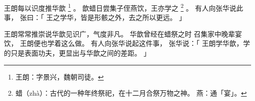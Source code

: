 
\switchcolumn*[\section{}]

王朗每以识度推华歆%
\footnote{%
    王朗：字景兴，魏朝司徒。
}%
。
歆蜡日尝集子侄燕饮，王亦学之%
\footnote{%
    蜡（zhà）：古代的一种年终祭祀，在十二月合祭万物之神。
    燕：通「宴」。
}%
。
有人向张华说此事，
张曰：「
    王之学华，皆是形骸之外，去之所以更远。
」

\switchcolumn

王朗常常推崇说华歆见识广，气度非凡。
华歆曾经在蜡祭之时
召集家中晚辈宴饮，
王朗便也学着这么做。
有人向张华说起这件事，
张华说：「
    王朗学华歆，学的只是表面功夫，更显出与华歆之间的差距。
」

